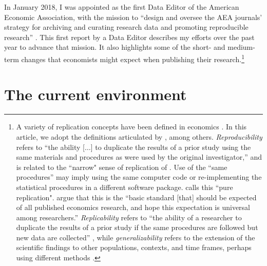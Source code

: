 \documentclass[PP]{AEA}
\begin{document}
In January 2018, I was appointed as the first Data Editor of the American Economic Association, with the mission to ``design  and  oversee  the  AEA  journals’  strategy for archiving and curating research data and promoting  reproducible  research'' \citep{10.1257/pandp.108.745}. This first report by a Data Editor describes my efforts over the past year to advance  that mission. It also highlights some of the short- and medium-term changes that economists might expect when publishing their research.\footnote{A variety of replication concepts have been defined in economics \citep{HamermeshCan.J.Econ.2007,ClemensJ.Econ.Surv.2017}. In this article, we adopt the definitions articulated by \citet{Bollen2015-vb}, among others. \textit{Reproducibility}  refers to ``the ability [$\dots$] to duplicate the results of a prior study using the same materials and procedures as were used by the original investigator,'' and is related to the ``narrow" sense of replication of \cite{PesaranJ.Appl.Econom.2003}. Use of the ``same procedures'' may imply using the same computer code or re-implementing the statistical procedures in a different software package. \cite{HamermeshCan.J.Econ.2007} calls this ``pure replication". \citet[p. 942]{ChristensenTransparencyReproducibilityCredibility2018} argue that this is the ``basic standard [that] should be expected of all published economics research, and hope this expectation is universal among researchers.'' \textit{Replicability} refers to ``the ability of a researcher to duplicate the results of a prior study if the same procedures are followed but new data are collected'' \citep[ ``wider'' sense of replication]{PesaranJ.Appl.Econom.2003}, while \textit{generalizability} refers to the extension of the scientific findings to other populations, contexts, and time frames, perhaps using different methods \citep[ ``scientific replication'']{Hamermesh2017-kq}.}


\section{The current environment}
\end{document}
